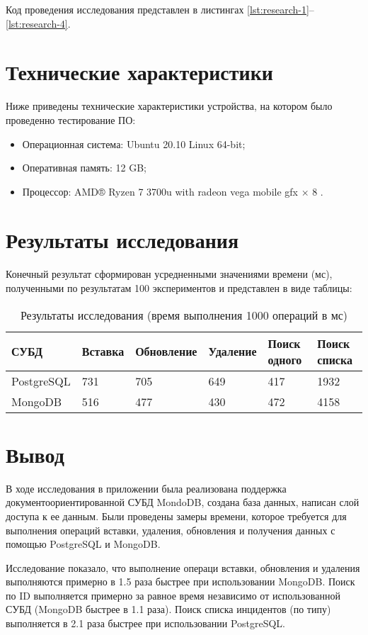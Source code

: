 Код проведения исследования представлен в листингах \ref{lst:research-1}--\ref{lst:research-4}. 

\newpage

\section{Технические характеристики}
Ниже приведены технические характеристики устройства, на котором было проведенно тестирование ПО:

\begin{itemize}
	\item Операционная система: Ubuntu 20.10 \cite{ubuntu} Linux \cite{linux} 64-bit;
	\item Оперативная память: 12 GB;
	\item Процессор: AMD® Ryzen 7 3700u with radeon vega mobile gfx × 8
	\cite{amd}.
\end{itemize}

\section{Результаты исследования}
Конечный результат сформирован усредненными значениями времени (мс), полученными по результатам 100 экспериментов и представлен в виде таблицы: 

\begin{table}[h]
	\begin{center}
		\caption{\label{tbl:research} Результаты исследования (время выполнения 1000 операций в мс)}
		\begin{tabular}{|p{24mm}|p{24mm}|p{24mm}|p{24mm}|p{24mm}|p{24mm}|}
			\hline
			СУБД & Вставка & Обновление & Удаление & Поиск одного & Поиск списка \\ \hline
			PostgreSQL & 731 & 705 & 649 & 417 & 1932\\ \hline
			MongoDB & 516 & 477 & 430 & 472 & 4158\\ \hline
		\end{tabular}
	\end{center}
\end{table}

\section*{Вывод}

В ходе исследования в приложении была реализована поддержка документоориентированной СУБД MondoDB, создана база данных, написан слой доступа к ее данным. Были проведены замеры времени, которое требуется для выполнения операций вставки, удаления, обновления и получения данных с помощью PostgreSQL и MongoDB.

Исследование показало, что выполнение операци вставки, обновления и удаления выполняются примерно в 1.5 раза быстрее при использовании MongoDB. Поиск по ID выполняется примерно за равное время независимо от использованной СУБД (MongoDB быстрее в 1.1 раза). Поиск списка инцидентов (по типу) выполняется в 2.1 раза быстрее при использовании PostgreSQL. 

